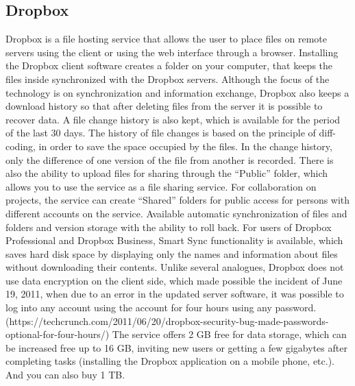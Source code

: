 \subsection{Dropbox}
Dropbox is a file hosting service that allows the user to place files on remote servers using the client or using the web interface through a browser.
Installing the Dropbox client software creates a folder on your computer, that keeps the files inside synchronized with the Dropbox servers.
Although the focus of the technology is on synchronization and information exchange, Dropbox also keeps a download history so that after deleting files from the server it is possible to recover data.
A file change history is also kept, which is available for the period of the last 30 days.
The history of file changes is based on the principle of diff-coding, in order to save the space occupied by the files.
In the change history, only the difference of one version of the file from another is recorded.
There is also the ability to upload files for sharing through the “Public” folder, which allows you to use the service as a file sharing service.
For collaboration on projects, the service can create “Shared” folders for public access for persons with different accounts on the service.
Available automatic synchronization of files and folders and version storage with the ability to roll back.
For users of Dropbox Professional and Dropbox Business, Smart Sync functionality is available, which saves hard disk space by displaying only the names and information about files without downloading their contents.
Unlike several analogues, Dropbox does not use data encryption on the client side, which made possible the incident of June 19, 2011, when due to an error in the updated server software, it was possible to log into any account using the account for four hours using any password. (https://techcrunch.com/2011/06/20/dropbox-security-bug-made-passwords-optional-for-four-hours/)
The service offers 2 GB free for data storage, which can be increased free up to 16 GB, inviting new users or getting a few gigabytes after completing tasks (installing the Dropbox application on a mobile phone, etc.). And you can also buy 1 TB.
